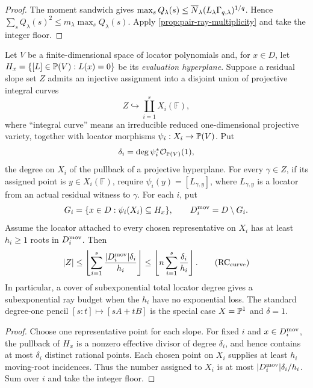 \documentclass[11pt,a4paper]{amsart}
\numberwithin{equation}{section}
\theoremstyle{remark}
\newcommand{\F}{\mathbb F}\newcommand{\B}{\mathbb B}\newcommand{\K}{\mathbb K}\newcommand{\Z}{\mathbb Z}
\begin{document}
\begin{proof}
The moment sandwich gives
\(\max_sQ_\lambda(s)\le\overline N_\lambda
(L_\lambda\Gamma_{q,\lambda})^{1/q}\).  Hence
\(\sum_sQ_\lambda(s)^2\le m_\lambda\max_sQ_\lambda(s)\).
Apply \cref{prop:pair-ray-multiplicity} and take the integer floor.
\end{proof}

\begin{proposition}
\label{prop:curve-degree-ray-compiler}
Let \(V\) be a finite-dimensional space of locator polynomials and, for
\(x\in D\), let
\(H_x=\{[L]\in\mathbb P(V):L(x)=0\}\) be its \emph{evaluation hyperplane}.
Suppose a residual slope set \(Z\) admits an injective assignment into a
disjoint union of projective integral curves
\[
              Z\hookrightarrow\coprod_{i=1}^sX_i(\F),
\]
where ``integral curve'' means an irreducible reduced one-dimensional
projective variety, together with locator morphisms
\(\psi_i:X_i\to\mathbb P(V)\).  Put
\[
 \delta_i=\deg\psi_i^*\mathcal O_{\mathbb P(V)}(1),
\]
the degree on \(X_i\) of the pullback of a projective hyperplane.  For
every \(\gamma\in Z\), if its assigned point is \(y\in X_i(\F)\), require
\(\psi_i(y)=[L_{\gamma,y}]\), where \(L_{\gamma,y}\) is a locator from an
actual residual witness to \(\gamma\).  For each \(i\), put
\[
 G_i=\{x\in D:\psi_i(X_i)\subseteq H_x\},
 \qquad D_i^{\rm mov}=D\setminus G_i.
\]
Assume the locator attached to every chosen representative on \(X_i\)
has at least \(h_i\ge1\) roots in \(D_i^{\rm mov}\).  Then
\[
 \abs Z\le
 \floor{\sum_{i=1}^s
       \frac{\abs{D_i^{\rm mov}}\delta_i}{h_i}}
 \le\floor{n\sum_{i=1}^s\frac{\delta_i}{h_i}}.
 \tag{RC$_{\rm curve}$}
\]
In particular, a cover of subexponential total locator degree gives a
subexponential ray budget when the \(h_i\) have no exponential loss.  The
standard degree-one pencil \([s:t]\mapsto[sA+tB]\) is the special case
\(X=\mathbb P^1\) and \(\delta=1\).
\end{proposition}

\begin{proof}
Choose one representative point for each slope.  For fixed \(i\) and
\(x\in D_i^{\rm mov}\), the pullback of \(H_x\) is a nonzero effective
divisor of degree \(\delta_i\), and hence contains at most \(\delta_i\)
distinct rational points.  Each chosen point on \(X_i\) supplies at least
\(h_i\) moving-root incidences.  Thus the number assigned to \(X_i\) is
at most \(\lvert D_i^{\rm mov}\rvert\delta_i/h_i\).  Sum over \(i\) and take
the integer floor.
\end{proof}
\end{document}
